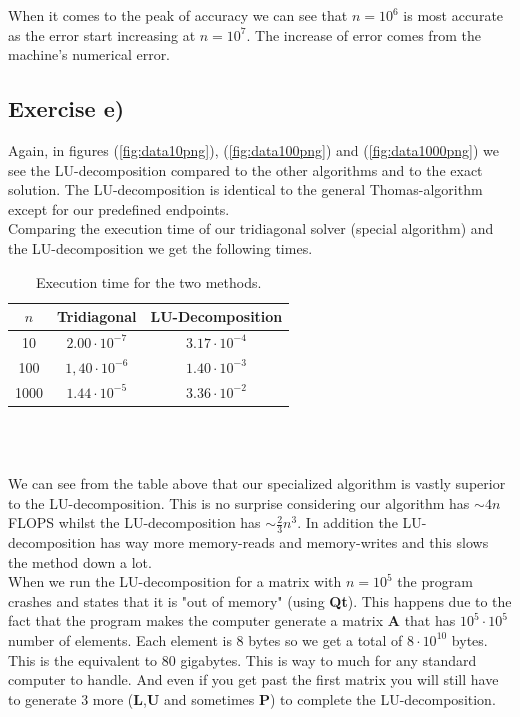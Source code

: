 \documentclass{article}
\begin{document}
  When it comes to the peak of accuracy we can see that $n=10^6$ is most accurate as the error start increasing at $n=10^7$. The increase of error comes from the machine's numerical error.

  \subsection{Exercise e)} \label{sec:Results e)}

  Again, in figures (\ref{fig:data10png}), (\ref{fig:data100png}) and (\ref{fig:data1000png}) we see the LU-decomposition compared to the other algorithms and to the exact solution. The LU-decomposition is identical to the general Thomas-algorithm except for our predefined endpoints.\\

  Comparing the execution time of our tridiagonal solver (special algorithm) and the LU-decomposition we get the following times. \\

  \begin{table}[ht] \label{tab:exec_time}
    \centering
      \caption{Execution time for the two methods.}
      \vspace{2mm}
      \begin{tabular}{|c|c|c|}
        \hline
        $n$    &   Tridiagonal      &  LU-Decomposition  \\
        \hline \hline
        10   & $2.00\cdot10^{-7}$ & $3.17\cdot10^{-4}$ \\
        100  & $1,40\cdot10^{-6}$ & $1.40\cdot10^{-3}$ \\
        1000 & $1.44\cdot10^{-5}$ & $3.36\cdot10^{-2}$ \\
        \hline
      \end{tabular} \\
      \hspace{0pt}\\
  \end{table}

  We can see from the table above that our specialized algorithm is vastly superior to the LU-decomposition. This is no surprise considering our algorithm has $\sim4n$ FLOPS whilst the LU-decomposition has $\sim\frac{2}{3}n^3$. In addition the LU-decomposition has way more memory-reads and memory-writes and this slows the method down a lot. \\

  When we run the LU-decomposition for a matrix with $n = 10^5$ the program crashes and states that it is "out of memory" (using \textbf{Qt}). This happens due to the fact that the program makes the computer generate a matrix \textbf{A} that has $10^5 \cdot 10^5$ number of elements. Each element is 8 bytes so we get a total of $8 \cdot 10^{10}$ bytes. This is the equivalent to $80$ gigabytes. This is way to much for any standard computer to handle. And even if you get past the first matrix you will still have to generate 3 more (\textbf{L},\textbf{U} and sometimes \textbf{P}) to complete the LU-decomposition.
\end{document}

